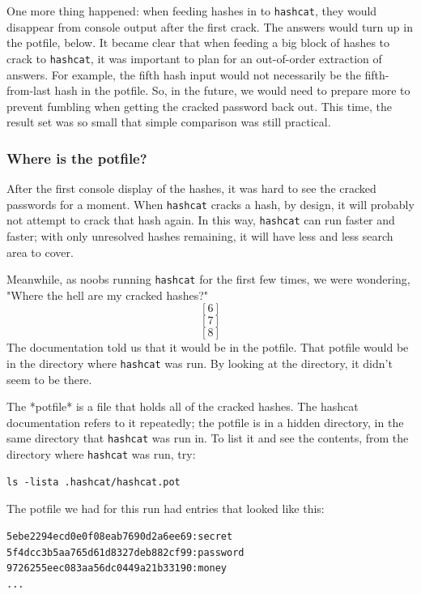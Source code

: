 One more thing happened:  when feeding hashes in to \texttt{hashcat}, they would disappear from console output after the first crack.  The answers would turn up in the potfile, below.  It became clear that when feeding a big block of hashes to crack to \texttt{hashcat}, it was important to plan for an out-of-order extraction of answers.  For example, the fifth \gls{hash} input would not necessarily be the fifth-from-last hash in the potfile.  So, in the future, we would need to prepare more to prevent fumbling when getting the cracked password back out.  This time, the result set was so small that simple comparison was still practical.

\subsubsection{Where is the potfile?}
After the first console display of the hashes, it was hard to see the cracked passwords for a moment.  When \texttt{hashcat} cracks a hash, by design, it will probably not attempt to crack that hash again.  In this way, \texttt{hashcat} can run faster and faster; with only unresolved hashes remaining, it will have less and less search area to cover.  

Meanwhile, as noobs running \texttt{hashcat} for the first few times, we were wondering, "Where the hell are my cracked hashes?" \[[6]\]\[[7]\]\[[8]\] The documentation told us that it would be in the potfile.  That potfile would be in the directory where \texttt{hashcat} was run.  By looking at the directory, it didn't seem to be there.  

The *potfile* is a file that holds all of the cracked hashes.  The hashcat documentation refers to it repeatedly; the potfile is in a hidden directory, in the same directory that \texttt{hashcat} was run in.  To list it and see the contents, from the directory where \texttt{hashcat} was run, try:

\begin{lstlisting}
ls -lista .hashcat/hashcat.pot
\end{lstlisting}

The potfile we had for this run had entries that looked like this:

\begin{lstlisting}
5ebe2294ecd0e0f08eab7690d2a6ee69:secret
5f4dcc3b5aa765d61d8327deb882cf99:password
9726255eec083aa56dc0449a21b33190:money
...
\end{lstlisting}

